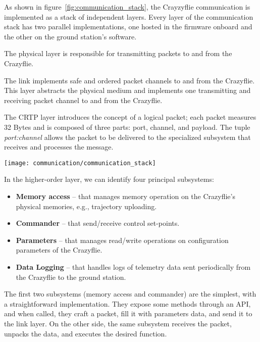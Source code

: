 As shown in figure~\ref{fig:communication_stack}, the Crayzyflie communication is implemented as a stack of independent layers.
Every layer of the communication stack has two parallel implementations, one hosted in the firmware onboard and the other on the ground station's software.

The physical layer is responsible for transmitting packets to and from the Crazyflie. 

The link implements safe and ordered packet channels to and from the Crazyflie. This layer abstracts the physical medium and implements one transmitting and receiving packet channel to and from the Crazyflie.

The CRTP layer introduces the concept of a logical packet; each packet measures 32 Bytes and is composed of three parts: port, channel, and payload.
The tuple \textit{port:channel} allows the packet to be delivered to the specialized subsystem that receives and processes the message.

\begin{SCfigure}[\sidecaptionrelwidth][h]
    \texttt{[image: communication/communication\_stack]}
    \caption[The Crazyflie communication stack]{The Crayzyflie communication stack is composed of 4 independent layers: Subsystems, CRTP, Link, Physical medium}
    \label{fig:communication_stack}
\end{SCfigure}

In the higher-order layer, we can identify four principal subsystems:
\begin{itemize}
    \item \textbf{Memory access} -- that manages memory operation on the Crazyflie's physical memories, e.g., trajectory uploading.
    \item \textbf{Commander} -- that send/receive control set-points.
    \item \textbf{Parameters} -- that manages read/write operations on configuration parameters of the Crazyflie.
    \item \textbf{Data Logging} -- that handles logs of telemetry data sent periodically from the Crazyflie to the ground station. 
\end{itemize} 

The first two subsystems (memory access and commander) are the simplest, with a straightforward implementation. 
They expose some methods through an API, and when called, they craft a packet, fill it with parameters data, and send it to the link layer.
On the other side, the same subsystem receives the packet, unpacks the data, and executes the desired function.

